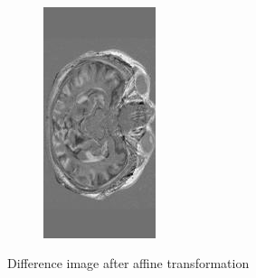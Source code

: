\documentclass[11pt,a4paper,oneside]{report}
\begin{document}
\begin{figure}[H]
\begin{subfigure}[b]{0.3\textwidth}
        \end{subfigure}
        ~~~~ %
        \begin{subfigure}[b]{0.3\textwidth}
                \includegraphics[width=\textwidth, height=\textwidth, trim=0 20 0 20, clip=true, angle=90 ]{figures/diff/t1Aff_z.jpg}
        \end{subfigure}
        \caption{Difference image after affine transformation}\label{fig:affine}
\end{figure}
\end{document}
